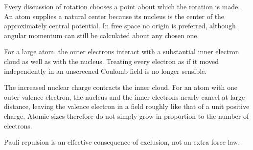 Every discussion of rotation chooses a point about which the rotation is made. An atom supplies a natural center because its nucleus is the center of the approximately central potential. In free space no origin is preferred, although angular momentum can still be calculated about any chosen one.

\begin{classroomqa}
\end{classroomqa}

For a large atom, the outer electrons interact with a substantial inner electron cloud as well as with the nucleus. Treating every electron as if it moved independently in an unscreened Coulomb field is no longer sensible.

\begin{classroomqa}
\end{classroomqa}

The increased nuclear charge contracts the inner cloud. For an atom with one outer valence electron, the nucleus and the inner electrons nearly cancel at large distance, leaving the valence electron in a field roughly like that of a unit positive charge. Atomic sizes therefore do not simply grow in proportion to the number of electrons.

\begin{classroomqa}
\end{classroomqa}

Pauli repulsion is an effective consequence of exclusion, not an extra force law.

